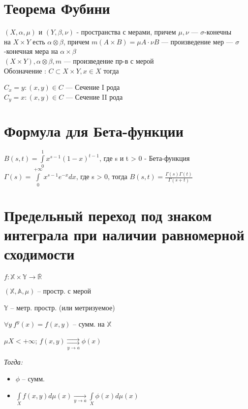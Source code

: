\documentclass[paper=a4, fontsize=14pt]{report}
\begin{document}
\section{Теорема Фубини}
$(X, \alpha, \mu)$ и $(Y, \beta, \nu)$ - пространства с мерами, причем $\mu , \nu$ --- $\sigma$-конечны\\
на $X \times Y$ есть $\alpha \otimes \beta$, причем $m(A \times B) = \mu A \cdot \nu B$ --- произведение мер --- $\sigma$-конечная мера на $\alpha \times \beta$\\
$(X \times Y), \alpha \otimes \beta, m$ --- произведение пр-в с мерой\\
Обозначение : $C \subset X \times Y, x \in X$ тогда 

$C_x = {y : (x, y) \in C}$ --- Сечение I рода\\
$C_y = {x : (x, y) \in C}$ --- Сечение II рода\\

\section{Формула для Бета-функции}
$B(s, t) = \int\limits_{0}^{1}x^{s-1}(1-x)^{t-1}$, где s и t > 0 - Бета-функция \\
$\Gamma(s) = \int\limits_{0}^{+\infty}x^{s-1}e^{-x}dx$, где s > 0, тогда $B(s, t) = \frac{\Gamma(s)\Gamma(t)}{\Gamma(s+t)}$ \\

\section{Предельный переход под знаком интеграла при наличии равномерной сходимости}
$ f : \mathbb{X} \times \mathbb{Y} \rightarrow \overline{\mathbb{R}}$

$ (\mathbb{X}, \mathbb{A}, \mu) $ -- простр. с мерой

$ \mathbb{Y} $ -- метр. простр. (или метризуемое)

$ \forall y ~ f^y(x) = f(x, y) $ -- сумм. на $ \mathbb{X} $

\bigskip

$ \mu X < +\infty $; $ f(x,y) \underset{y \rightarrow a}{\rightrightarrows} \phi(x) $

\emph{Тогда:}

\begin{itemize}
	\item $ \phi $ -- сумм.
	\item $ \int\limits_{X} f(x, y) d\mu (x) \underset{y \rightarrow a}{\longrightarrow} \int\limits_{X} \phi(x) d\mu(x) $
\end{itemize}
\end{document}
